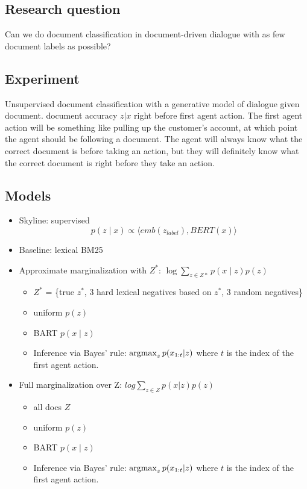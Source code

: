\documentclass[11pt]{article}
\begin{document}
\subsection{Research question}
Can we do document classification in document-driven dialogue with as few document labels as possible?

\subsection{Experiment}
Unsupervised document classification with a generative model of dialogue given document.
document accuracy $z|x$ right before first agent action.
The first agent action will be something like pulling up the customer's account,
at which point the agent should be following a document.
The agent will always know what the correct document is before taking an action,
but they will definitely know what the correct document is right before they take an action.

\subsection{Models}
\begin{itemize}
\item Skyline: supervised $$p(z \mid x) \propto \langle emb(z_{label}), BERT(x)\rangle$$
\item Baseline: lexical BM25
\item Approximate marginalization with $Z^*$: $\log\sum_{z\in Z*} p(x\mid z) p(z)$
    \begin{itemize}
    \item $Z^*$ = \{true $z^*$, 3 hard lexical negatives based on $z^*$, 3 random negatives\}
    \item uniform $p(z)$
    \item BART $p(x \mid z)$
    \item Inference via Bayes' rule: $\operatorname*{argmax}_z p(x_{1:t}|z)$ where $t$ is the index
        of the first agent action.
    \end{itemize}
\item Full marginalization over Z: $log\sum_{z\in Z} p(x|z)p(z)$
    \begin{itemize}
    \item all docs $Z$
    \item uniform $p(z)$
    \item BART $p(x \mid z)$
    \item Inference via Bayes' rule: $\operatorname*{argmax}_z p(x_{1:t}|z)$ where $t$ is the index
        of the first agent action.
    \end{itemize}
\end{itemize}
\end{document}
